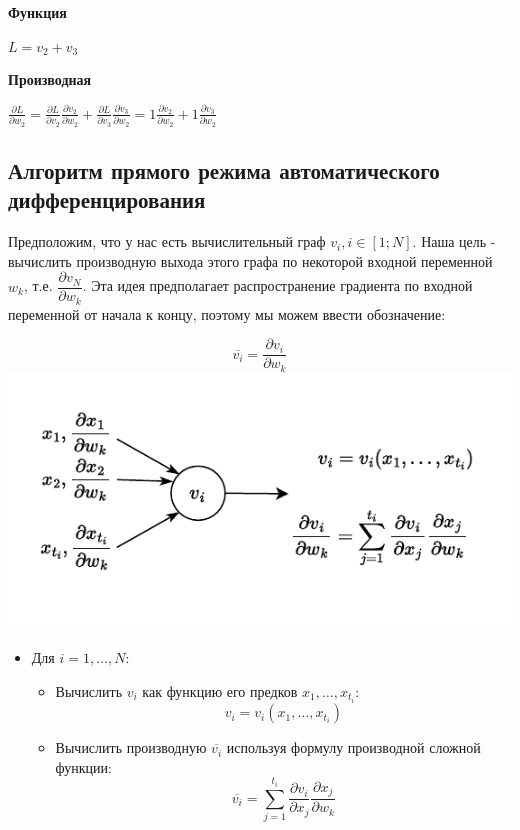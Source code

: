 \documentclass[
  russian,
  letterpaper,
  DIV=11,
  numbers=noendperiod]{scrartcl}
\providecommand{\tightlist}{%
  \setlength{\itemsep}{0pt}\setlength{\parskip}{0pt}}
\begin{document}
\textbf{Функция}

\(L = v_2 + v_3\)

\textbf{Производная}

\(\frac{\partial L}{\partial w_2} = \frac{\partial L}{\partial v_2}\frac{\partial v_2}{\partial w_2} + \frac{\partial L}{\partial v_3}\frac{\partial v_3}{\partial w_2} = 1\frac{\partial v_2}{\partial w_2} + 1\frac{\partial v_3}{\partial w_2}\)

\subsection{Алгоритм прямого режима автоматического
дифференцирования}\label{ux430ux43bux433ux43eux440ux438ux442ux43c-ux43fux440ux44fux43cux43eux433ux43e-ux440ux435ux436ux438ux43cux430-ux430ux432ux442ux43eux43cux430ux442ux438ux447ux435ux441ux43aux43eux433ux43e-ux434ux438ux444ux444ux435ux440ux435ux43dux446ux438ux440ux43eux432ux430ux43dux438ux44f}

Предположим, что у нас есть вычислительный граф \(v_i, i \in [1; N]\).
Наша цель - вычислить производную выхода этого графа по некоторой
входной переменной \(w_k\), т.е. \(\dfrac{\partial v_N}{\partial w_k}\).
Эта идея предполагает распространение градиента по входной переменной от
начала к концу, поэтому мы можем ввести обозначение:

\[
\overline{v_i} = \dfrac{\partial v_i}{\partial w_k}
\]
\includegraphics[width=0.6\linewidth,height=\textheight,keepaspectratio]{auto_diff_forward.pdf}

\begin{itemize}
\tightlist
\item
  Для \(i = 1, \ldots, N\):

  \begin{itemize}
  \tightlist
  \item
    Вычислить \(v_i\) как функцию его предков \(x_1, \ldots, x_{t_i}\):
    \[
      v_i = v_i(x_1, \ldots, x_{t_i})
      \]
  \item
    Вычислить производную \(\overline{v_i}\) используя формулу
    производной сложной функции: \[
      \overline{v_i} = \sum_{j = 1}^{t_i}\dfrac{\partial v_i}{\partial x_j}\dfrac{\partial x_j}{\partial w_k}
      \]
  \end{itemize}
\end{itemize}
\end{document}
